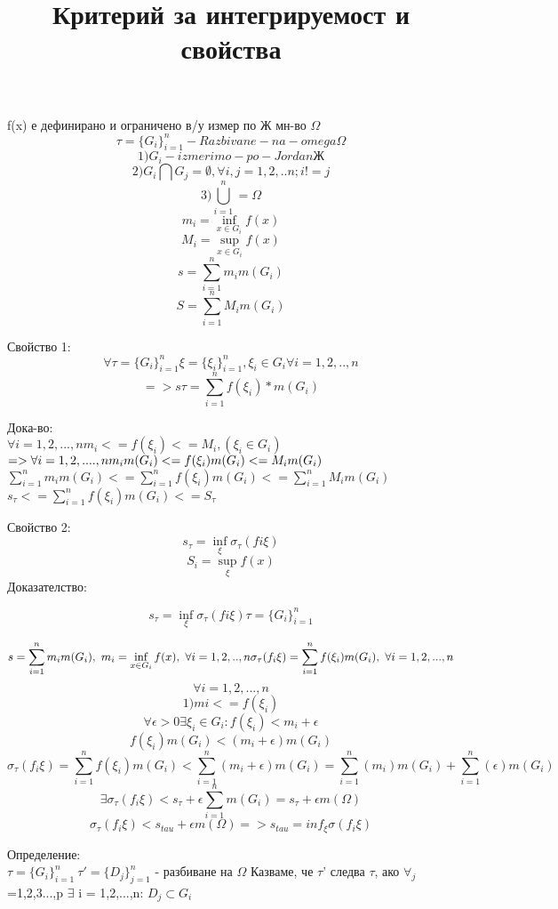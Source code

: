 \documentclass{article}
\title{Критерий за интегрируемост и свойства}
\begin{document}
f(x) е дефинирано и ограничено в/у измер по Ж мн-во $\Omega$ 
$$
\tau=\{G_i\}_{i=1}^{n} -Razbivane-na-omega \Omega
$$
$$
1)G_{i}-izmerimo-po-Jordan Ж 
$$
$$
2)G_{i} \bigcap G_{j}= \emptyset, \forall  i, j = 1, 2, .. n; i != j
$$
$$
3)\bigcup_{i=1}^{n} = \Omega
$$
$$
m_{i}=\inf_{x \in  G_{i}} f(x)
$$
$$
M_{i}=\sup_{x \in  G_{i}} f(x)
$$
$$
s=\sum_{i=1}^{n} m_{i}m(G_{i}) 
$$
$$
S=\sum_{i=1}^{n} M_{i}m(G_{i}) 
$$

Свойство 1:
$$
\forall \tau=\{G_{i}\}_{i=1}^n \xi=\{\xi_{i}\}_{i=1}^{n}, \xi_i \in G_{i} \forall i = 1,2,..,n
$$
$$
=>s\tau=\sum_{i=1}^{n} f(\xi_i)*m(G_{i})
$$

Дока-во:\\
$\forall i=1,2,...,n m_{i}<=f(\xi_{i})<=M_{i}, (\xi_{i} \in G_{i})$\\
$=> \forall i = 1, 2, .... , n \\ m_{i}m(G_{i})<=f(\xi_{i})m(G_{i})<=M_{i}m(G_{i})$ \\
$\sum_{i=1}^{n} m_{i}m(G_{i})<= \sum_{i=1}^{n} f(\xi_{i})m(G_{i})<= \sum_{i=1}^{n} M_{i}m(G_{i}) $ \\
$s_{\tau}<= \sum_{i=1}^{n} f(\xi_{i})m(G_{i})<= S_{\tau} $


Свойство 2: \\
$$
s_{\tau}=\inf_{\xi} \sigma_{\tau}(fi \xi)
$$
$$
S_{i}=\sup_{\xi} f(x)
$$
Доказателство:

$$
s_{\tau}=\inf_{\xi} \sigma_{\tau}(fi \xi)
\tau=\{G_{i}\}_{i=1}^n
$$

$$
s=\sum_{i=1}^{n} m_{i}m(G_{i}), \ m_i= \inf_{x \in G _{i}} f(x), \ \forall i = 1, 2, .., n
\sigma_{\tau}(f_{i} \xi)= \sum_{i=1}^{n} f(\xi_{i})m(G_{i}), \ \forall i = 1, 2, ..., n
\newline
$$
$$\forall  i = 1, 2, ..., n$$
$$1)mi<=f(\xi_{i})$$
$$\forall \epsilon > 0 \exists \xi_{i} \in G_{i} : f(\xi_i) < m_{i} + \epsilon$$
$$f(\xi_i)m(G_{i}) < (m_{i} + \epsilon)m(G_{i})$$
$$\sigma_{\tau}(f_{i} \xi)= \sum_{i=1}^{n} f(\xi_i)m(G_{i}) < \sum_{i=1}^{n}(m_{i} + \epsilon)m(G_{i})=\sum_{i=1}^{n}(m_{i})m(G_{i}) + \sum_{i=1}^{n}( \epsilon)m(G_{i})$$
$$ \exists \sigma_{\tau}(f_{i} \xi) < s_{\tau} + \epsilon \sum_{i=1}^{n} m(G_{i})=s_{\tau}+ \epsilon m(\Omega)$$
$$\sigma_{\tau}(f_{i}\xi)<s_{tau}+\epsilon m(\Omega)=>s_{tau}=inf_\xi \sigma(f_{i}\xi)$$

Определение: \\
$\tau= \{G_{i}\}_{i=1}^{n} \ \tau '= \{D_{j}\}_{j=1}^{n}$ - разбиване на $\Omega$ Казваме, че $\tau$' следва $\tau$, ако  $\forall_{j}$=1,2,3...,p $\exists$ i = 1,2,...,n: $D_{j} \subset G_{i}$
\end{document}
